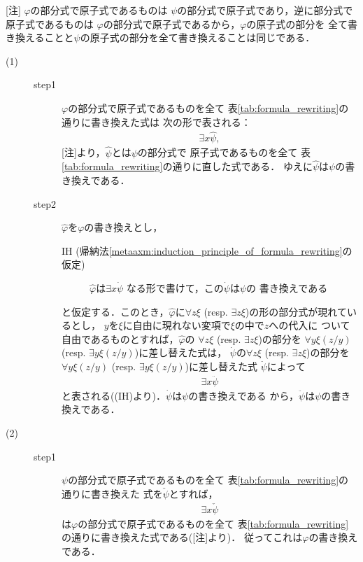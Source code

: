 	\begin{metaprf}\mbox{}
		[注] $\varphi$の部分式で原子式であるものは
		$\psi$の部分式で原子式であり，逆に部分式で原子式であるものは
		$\varphi$の部分式で原子式であるから，$\varphi$の原子式の部分を
		全て書き換えることと$\psi$の原子式の部分を全て書き換えることは同じである．
		\begin{description}
			\item[(1)] 
				\begin{description}
					\item[step1]
						$\varphi$の部分式で原子式であるものを全て
						表\ref{tab:formula_rewriting}の通りに書き換えた式は
						次の形で表される：
						\begin{align}
							\exists x \hat{\psi},
						\end{align}
						[注]より，$\hat{\psi}$とは$\psi$の部分式で
						原子式であるものを全て
						表\ref{tab:formula_rewriting}の通りに直した式である．
						ゆえに$\hat{\psi}$は$\psi$の書き換えである．
						
					\item[step2]
						$\widehat{\varphi}$を$\varphi$の書き換えとし，
						\begin{description}
							\item[IH (帰納法\ref{metaaxm:induction_principle_of_formula_rewriting}の仮定)]
								$\widehat{\varphi}$は$\exists x \dot{\psi}$
								なる形で書けて，この$\dot{\psi}$は$\psi$の
								書き換えである
						\end{description}
						と仮定する．このとき，$\widehat{\varphi}$に$\forall z \xi$ 
						(resp. $\exists z \xi$)の形の部分式が現れているとし，
						$y$を$\xi$に自由に現れない変項で$\xi$の中で$z$への代入に
						ついて自由であるものとすれば，$\widehat{\varphi}$の
						$\forall z \xi$ (resp. $\exists z \xi$)の部分を
						$\forall y \xi(z/y)$
						(resp. $\exists y \xi(z/y)$)に差し替えた式は，
						$\dot{\psi}$の$\forall z \xi$
						(resp. $\exists z \xi$)の部分を
						$\forall y \xi(z/y)$
						(resp. $\exists y \xi(z/y)$)に差し替えた式
						$\ddot{\psi}$によって
						\begin{align}
							\exists x \ddot{\psi}
						\end{align}
						と表される((IH)より)．$\dot{\psi}$は$\psi$の書き換えである
						から，$\ddot{\psi}$は$\psi$の書き換えである．
				\end{description}
				
			\item[(2)]		
				\begin{description}
					\item[step1]
						$\psi$の部分式で原子式であるものを全て
						表\ref{tab:formula_rewriting}の通りに書き換えた
						式を$\check{\psi}$とすれば，
						\begin{align}
							\exists x \check{\psi}
						\end{align}
						は$\varphi$の部分式で原子式であるものを全て
						表\ref{tab:formula_rewriting}の通りに書き換えた式である([注]より)．
						従ってこれは$\varphi$の書き換えである．
								

\end{description}
\end{description}
\end{metaprf}
